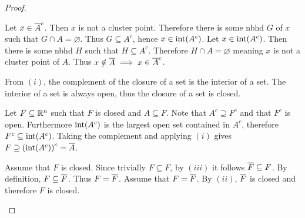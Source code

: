 \documentclass[../main.tex]{subfiles}
\begin{document}
\begin{proof}
    \begin{romanlist}
        \item Let $x \in \overline{A}^c$. Then $x$ is not a cluster point. Therefore there is some nbhd $G$ of $x$ such that $G \cap A = \varnothing$. Thus $G \subseteq A^c$, hence $x \in \operatorname{int}(A^c)$. Let $x \in \operatorname{int}(A^c)$. Then there is some nbhd $H$ such that $H \subseteq A^c$. Therefore $H \cap A = \varnothing$ meaning $x$ is not a cluster point of $A$. Thus $x \notin \overline{A} \implies x \in \overline{A}^c$.

        \item From $(i)$, the complement of the closure of a set is the interior of a set. The interior of a set is always open, thus the closure of a set is closed.

        \item Let $F \subseteq \mathbb{R}^n$ such that $F$ is closed and $A \subseteq F$. Note that $A^c \supseteq F^c$ and that $F^c$ is open. Furthermore $\operatorname{int}(A^c)$ is the largest open set contained in $A^c$, therefore $F^c \subseteq \operatorname{int}(A^c)$. Taking the complement and applying $(i)$ gives $F \supseteq \qty(\operatorname{int}(A^c))^c = \overline{A}$.

        \item Assume that $F$ is closed. Since trivially $F \subseteq F$, by $(iii)$ it follows $\overline{F} \subseteq F$. By definition, $F \subseteq \overline{F}$. Thus $F = \overline{F}$. Assume that $F = \overline{F}$. By $(ii)$, $\overline{F}$ is closed and therefore $F$ is closed.
    \end{romanlist}
\end{proof}
\end{document}
